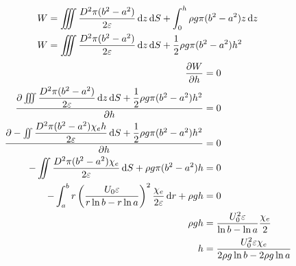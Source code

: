 \begin{align*}
    W&=\iiint\frac{D^2\pi(b^2-a^2)}{2\varepsilon}\dif z\dif S+\int_{0}^{h}\rho g\pi(b^2-a^2)z\dif z\\
    W&=\iiint\frac{D^2\pi(b^2-a^2)}{2\varepsilon}\dif z\dif S+\frac{1}{2}\rho g\pi(b^2-a^2)h^2
    \end{align*}
    \begin{align*}
    \frac{\partial W}{\partial h}&=0\\
    \frac{\partial \iiint\dfrac{D^2\pi(b^2-a^2)}{2\varepsilon}\dif z\dif S+\dfrac{1}{2}\rho g\pi(b^2-a^2)h^2}{\partial h}&=0\\
    \frac{\partial -\iint\dfrac{D^2\pi(b^2-a^2)\chi_eh}{2\varepsilon}\dif S+\dfrac{1}{2}\rho g\pi(b^2-a^2)h^2}{\partial h}&=0\\
    -\iint\dfrac{D^2\pi(b^2-a^2)\chi_e}{2\varepsilon}\dif S+\rho g\pi(b^2-a^2)h&=0\\
    -\int_a^br\left(\frac{U_0\varepsilon}{r\ln b-r\ln a}\right)^2\dfrac{\chi_e}{2\varepsilon}\dif r+\rho gh&=0\\
    \rho gh&=\frac{U_0^2\varepsilon}{\ln b-\ln a}\dfrac{\chi_e}{2}\\
    h&=\frac{U_0^2\varepsilon\chi_e}{2\rho g\ln b-2\rho g\ln a}
\end{align*}
